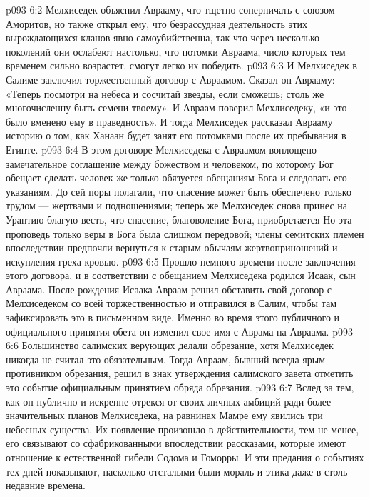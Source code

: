\vs p093 6:2 Мелхиседек объяснил Аврааму, что тщетно соперничать с союзом Аморитов, но также открыл ему, что безрассудная деятельность этих вырождающихся кланов явно самоубийственна, так что через несколько поколений они ослабеют настолько, что потомки Авраама, число которых тем временем сильно возрастет, смогут легко их победить.
\vs p093 6:3 И Мелхиседек в Салиме заключил торжественный договор с Авраамом. Сказал он Аврааму: «Теперь посмотри на небеса и сосчитай звезды, если сможешь; столь же многочисленну быть семени твоему». И Авраам поверил Мехлиседеку, «и это было вменено ему в праведность». И тогда Мелхиседек рассказал Аврааму историю о том, как Ханаан будет занят его потомками после их пребывания в Египте.
\vs p093 6:4 \pc В этом договоре Мелхиседека с Авраамом воплощено замечательное соглашение между божеством и человеком, по которому Бог обещает сделать  человек же только обязуется  обещаниям Бога и следовать его указаниям. До сей поры полагали, что спасение может быть обеспечено только трудом --- жертвами и подношениями; теперь же Мелхиседек снова принес на Урантию благую весть, что спасение, благоволение Бога, приобретается  Но эта проповедь только веры в Бога была слишком передовой; члены семитских племен впоследствии предпочли вернуться к старым обычаям жертвоприношений и искупления греха кровью.
\vs p093 6:5 Прошло немного времени после заключения этого договора, и в соответствии с обещанием Мелхиседека родился Исаак, сын Авраама. После рождения Исаака Авраам решил обставить свой договор с Мелхиседеком со всей торжественностью и отправился в Салим, чтобы там зафиксировать это в письменном виде. Именно во время этого публичного и официального принятия обета он изменил свое имя с Аврама на Авраама.
\vs p093 6:6 Большинство салимских верующих делали обрезание, хотя Мелхиседек никогда не считал это обязательным. Тогда Авраам, бывший всегда ярым противником обрезания, решил в знак утверждения салимского завета отметить это событие официальным принятием обряда обрезания.
\vs p093 6:7 Вслед за тем, как он публично и искренне отрекся от своих личных амбиций ради более значительных планов Мелхиседека, на равнинах Мамре ему явились три небесных существа. Их появление произошло в действительности, тем не менее, его связывают со сфабрикованными впоследствии рассказами, которые имеют отношение к естественной гибели Содома и Гоморры. И эти предания о событиях тех дней показывают, насколько отсталыми были мораль и этика даже в столь недавние времена.

